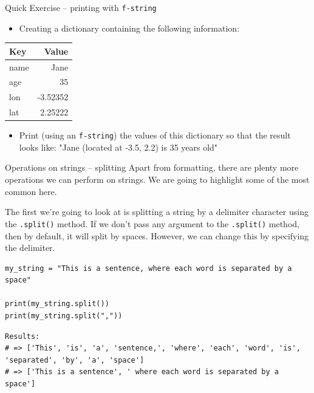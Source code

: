\documentclass[10pt]{beamer}
\begin{document}
\begin{frame}[label={sec:org9770681},fragile]{Quick Exercise -- printing with \texttt{f-string}}
 \begin{itemize}
\item Creating a dictionary containing the following information:
\end{itemize}

\begin{center}
\begin{tabular}{lr}
Key & Value\\
\hline
name & Jane\\
age & 35\\
lon & -3.52352\\
lat & 2.25222\\
\end{tabular}
\end{center}

\begin{itemize}
\item Print (using an \texttt{f-string}) the values of this dictionary so that the result looks
like: "Jane (located at -3.5, 2.2) is 35 years old"
\end{itemize}
\end{frame}

\begin{frame}[label={sec:org0f9d367},fragile]{Operations on strings -- splitting}
 Apart from formatting, there are plenty more operations we can perform on strings. We
are going to highlight some of the most common here.

The first we're going to look at is splitting a string by a delimiter character using
the \texttt{.split()} method. If we don't pass any argument to the \texttt{.split()} method, then by
default, it will split by spaces. However, we can change this by specifying the
delimiter.

\begin{verbatim}
my_string = "This is a sentence, where each word is separated by a space"

print(my_string.split())
print(my_string.split(","))
\end{verbatim}

\begin{verbatim}
Results: 
# => ['This', 'is', 'a', 'sentence,', 'where', 'each', 'word', 'is', 'separated', 'by', 'a', 'space']
# => ['This is a sentence', ' where each word is separated by a space']
\end{verbatim}
\end{frame}
\end{document}
